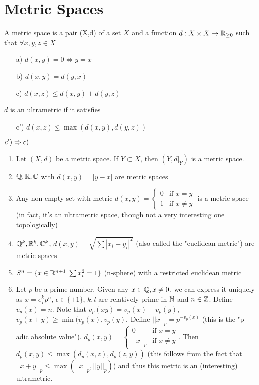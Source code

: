 \section*{Metric Spaces}
\begin{mydef}
A metric space is a pair (X,d) of a set $X$ and a function $d: X\times X\to\mathbb{R}_{\geq 0}$ such that $\forall x,y,z \in X$
\begin{enumerate}
\item[a)] $d(x,y) = 0 \Leftrightarrow y=x$
\item[b)] $d(x,y) = d(y,x)$
\item[c)] $d(x,z) \leq d(x,y) + d(y,z)$
\end{enumerate}
$d$ is an ultrametric if it satisfies
\begin{enumerate}
\item[c')] $d(x,z) \leq \max(d(x,y),d(y,z))$
\end{enumerate}
 $c')\Rightarrow c)$
\end{mydef}
\begin{example}
\begin{enumerate}[start=0]
\item Let $(X,d)$ be a metric space. If $Y\subset X$, then $(Y,d|_Y)$ is a metric space.
\item $\mathbb{Q},\mathbb{R},\mathbb{C}$ with $d(x,y)=|y-x|$ are metric spaces
\item Any non-empty set with metric $d(x,y)=\begin{cases} 0 &\mbox{if } x=y \\ 1 & \mbox{if }  x\neq y \end{cases}$ is a metric space (in fact, it's an ultrametric space, though not a very interesting one topologically)
\item $\mathbb{Q}^k,\mathbb{R}^k,\mathbb{C}^k$, $d(x,y)=\sqrt{\sum|x_i-y_i|^2}$ (also called the "euclidean metric") are metric spaces
\item $S^n=\{x\in\mathbb{R}^{n+1}|\sum x_i^2=1\}$ (n-sphere) with a restricted euclidean metric
\item Let $p$ be a prime number. Given any $x\in\mathbb{Q},x\neq0$. we can express it uniquely as $x=\epsilon \frac{k}{l} p^n$, $\epsilon\in\{\pm 1\}$, $k,l$ are relatively prime in $\mathbb{N}$ and $n\in\mathbb{Z}$. Define $v_p(x)=n$. Note that $v_p(xy)=v_p(x)+v_p(y)$, $v_p(x+y)\geq \min(v_p(x),v_p(y)$. Define $||x||_p=p^{-v_p(x)}$ (this is the "p-adic absolute value"). $d_p(x,y)=\begin{cases} 0 &\mbox{if } x=y \\ ||x||_p & \mbox{if }  x\neq y \end{cases}$. Then $d_p(x,y)\leq\max(d_p(x,z),d_p(z,y))$ (this follows from the fact that $||x+y||_p\leq\max(||x||_p,||y||_p)$) and thus this metric is an (interesting) ultrametric.
\end{enumerate}
\end{example}
